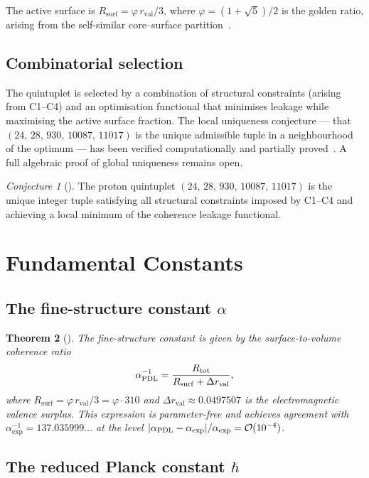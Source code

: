\documentclass[11pt,a4paper]{article}
\theoremstyle{plain}
\newtheorem{theorem}{Theorem}[section]
\theoremstyle{definition}
\theoremstyle{remark}
\newtheorem{conjecture}[theorem]{Conjecture}
\newcommand{\PDL}{\textnormal{PDL}}
\newcommand{\quintuplet}{(24,\,28,\,930,\,10087,\,11017)}
\newcommand{\rval}{r_{\mathrm{val}}}
\newcommand{\Rsurf}{R_{\mathrm{surf}}}
\newcommand{\Rtot}{R_{\mathrm{tot}}}
\begin{document}
The active surface is $\Rsurf = \varphi\,\rval/3$, where $\varphi=(1+\sqrt{5})/2$ is the golden ratio, arising from the self-similar core--surface partition~\citep{D05,D12}.

\subsection{Combinatorial selection}
\label{subsec:combinatorial}

The quintuplet is selected by a combination of structural constraints (arising from C1--C4) and an optimisation functional that minimises leakage while maximising the active surface fraction.
The local uniqueness conjecture — that $\quintuplet$ is the unique admissible tuple in a neighbourhood of the optimum — has been verified computationally and partially proved~\citep{D16,D16b}.
A full algebraic proof of global uniqueness remains open.

\begin{conjecture}[\citep{D16b}]
\label{conj:uniqueness}
The proton quintuplet $\quintuplet$ is the unique integer tuple satisfying all structural constraints imposed by C1--C4 and achieving a local minimum of the coherence leakage functional.
\end{conjecture}

\section{Fundamental Constants}
\label{sec:constants}

\subsection{The fine-structure constant \texorpdfstring{$\alpha$}{alpha}}
\label{subsec:alpha}

\begin{theorem}[\citep{D12,D25}]
\label{thm:alpha}
The fine-structure constant is given by the surface-to-volume coherence ratio
\[
\alpha_{\PDL}^{-1} = \frac{\Rtot}{\Rsurf + \Delta\rval},
\]
where $\Rsurf = \varphi\,\rval/3 = \varphi\cdot 310$ and $\Delta\rval\approx 0.0497507$ is the electromagnetic valence surplus.
This expression is parameter-free and achieves agreement with $\alpha_{\exp}^{-1}=137.035999\ldots$ at the level $|\alpha_{\PDL}-\alpha_{\exp}|/\alpha_{\exp}=\mathcal{O}(10^{-4})$.
\end{theorem}

\subsection{The reduced Planck constant \texorpdfstring{$\hbar$}{hbar}}
\label{subsec:hbar}
\end{document}
